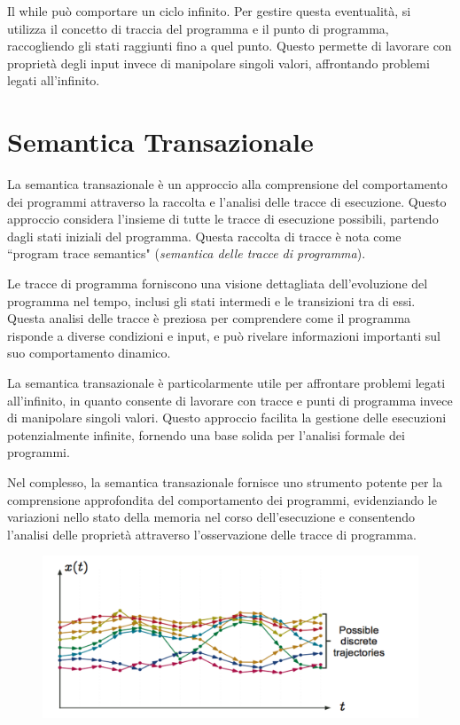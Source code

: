 Il while può comportare un ciclo infinito. Per gestire questa
eventualità, si utilizza il concetto di traccia del programma e il
punto di programma, raccogliendo gli stati raggiunti fino a quel punto.
Questo permette di lavorare con proprietà degli input invece di
manipolare singoli valori, affrontando problemi legati all'infinito.
\section{Semantica Transazionale}

La semantica transazionale è un approccio alla comprensione del
comportamento dei programmi attraverso la raccolta e l'analisi delle
tracce di esecuzione. Questo approccio considera l'insieme di tutte
le tracce di esecuzione possibili, partendo dagli stati iniziali del
programma. Questa raccolta di tracce è nota come ``program trace
semantics" (\textit{semantica delle tracce di programma}).

Le tracce di programma forniscono una visione dettagliata
dell'evoluzione del programma nel tempo, inclusi gli stati intermedi
e le transizioni tra di essi. Questa analisi delle tracce è preziosa
per comprendere come il programma risponde a diverse condizioni e
input, e può rivelare informazioni importanti sul suo comportamento
dinamico.

La semantica transazionale è particolarmente utile per affrontare
problemi legati all'infinito, in quanto consente di lavorare con
tracce e punti di programma invece di manipolare singoli valori.
Questo approccio facilita la gestione delle esecuzioni potenzialmente
infinite, fornendo una base solida per l'analisi formale dei programmi.

Nel complesso, la semantica transazionale fornisce uno strumento potente
per la comprensione approfondita del comportamento dei programmi,
evidenziando le variazioni nello stato della memoria nel corso
dell'esecuzione e consentendo l'analisi delle proprietà attraverso
l'osservazione delle tracce di programma.
\begin{figure}[H]
  \centering 
  \includegraphics[scale=0.5]{img/collezionetacce.png}
\end{figure}

